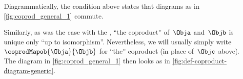 \begin{remark}
    Diagrammatically, the condition above states that diagrams as in \cref{fig:coprod_general_1} commute.
    \begin{marginfigure}
        \centering
        \caption{}
        \label{fig:coprod_general_1}
        \label{fig:def-coproduct-diagram}
    \end{marginfigure}
    Similarly, as was the case with the , ``the coproduct'' of~$\Obja$ and~$\Objb$ is unique only ``up to isomorphism''.
    Nevertheless, we will usually simply write~$\coprodMapob{\Obja}{\Objb}$ for ``the'' coproduct (in place of~$\Objc$ above).
    The diagram in \cref{fig:coprod_general_1} then looks as in \cref{fig:def-coproduct-diagram-generic}.
\end{remark}

\begin{marginfigure}
    \centering
    \caption{}
    \label{fig:def-coproduct-diagram-generic}
\end{marginfigure}
%
%

%



